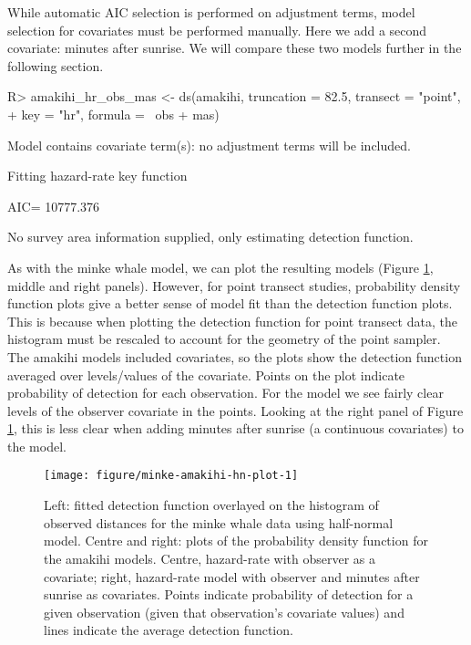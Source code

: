 \documentclass[article]{jss}\usepackage[]{graphicx}\usepackage[]{color}
\makeatletter
\def\maxwidth{ %
  \ifdim\Gin@nat@width>\linewidth
    \linewidth
  \else
    \Gin@nat@width
  \fi
}
\makeatother
\begin{document}
While automatic AIC selection is performed on adjustment terms, model selection for covariates must be performed manually. Here we add a second covariate: minutes after sunrise. We will compare these two models further in the following section.
\begin{Schunk}
\begin{Sinput}
R> amakihi_hr_obs_mas <- ds(amakihi, truncation = 82.5, transect = "point",
+                          key = "hr", formula = ~obs + mas)
\end{Sinput}
\begin{Soutput}
Model contains covariate term(s): no adjustment terms will be included.
\end{Soutput}
\begin{Soutput}
Fitting hazard-rate key function
\end{Soutput}
\begin{Soutput}
AIC= 10777.376
\end{Soutput}
\begin{Soutput}
No survey area information supplied, only estimating detection function.
\end{Soutput}
\end{Schunk}
As with the minke whale model, we can plot the resulting models (Figure \ref{fig:minkeamakihi}, middle and right panels). However, for point transect studies, probability density function plots give a better sense of model fit than the detection function plots. This is because when plotting the detection function for point transect data, the histogram must be rescaled to account for the geometry of the point sampler. The amakihi models included covariates, so the plots show the detection function averaged over levels/values of the covariate. Points on the plot indicate probability of detection for each observation. For the  model we see fairly clear levels of the observer covariate in the points. Looking at the right panel of Figure \ref{fig:minkeamakihi}, this is less clear when adding minutes after sunrise (a continuous covariates) to the model.

\begin{figure}
\begin{center}
\begin{Schunk}

\texttt{[image: figure/minke-amakihi-hn-plot-1]} \end{Schunk}
\caption{Left: fitted detection function overlayed on the histogram of observed distances for the minke whale data using half-normal model. Centre and right: plots of the probability density function for the amakihi models. Centre, hazard-rate with observer as a covariate; right, hazard-rate model with observer and minutes after sunrise as covariates. Points indicate probability of detection for a given observation (given that observation's covariate values) and lines indicate the average detection function.}
\label{fig:minkeamakihi}
\end{center}
\end{figure}
\end{document}
